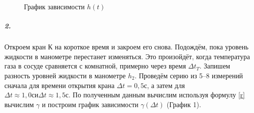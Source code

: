 \documentclass[a4paper,12pt]{article}
\begin{document}
\begin{figure}[b!]	\label{plan2}
	
	\caption{График зависимости $h(t)$}
	
\end{figure}



\subparagraph*{2.} Откроем кран К на короткое время и закроем его снова. Подождём, пока уровень жидкости в манометре перестанет изменяться. Это произойдёт, когда температура газа в сосуде сравняется с комнатной, примерно через время $\Delta t_T$. Запишем разность уровней жидкости в манометре $h_2$. Проведём серию из 5--8 измерений сначала для времени открытия крана $\Delta t = 0,5 с$, а затем для $\Delta t \approx 1,0 с и \Delta t \approx 1,5 с$. По полученным данным вычислим используя формулу \eqref{r} вычислим $\gamma$ и построим график зависимости $\gamma(\Delta t)$ (График 1).
\end{document}
